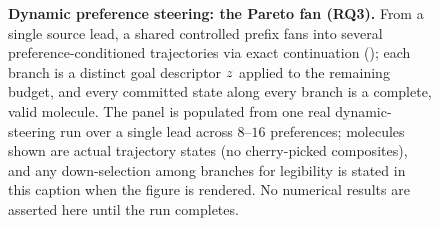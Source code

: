 \begin{figure}[t]
\centering
{}
\caption{\textbf{Dynamic preference steering: the Pareto fan (RQ3).} From a single source lead, a shared
controlled prefix fans into several preference-conditioned trajectories via exact continuation
(); each branch is a distinct goal descriptor $z$ applied to the remaining budget,
and every committed state along every branch is a complete, valid molecule. The panel is populated from
one real dynamic-steering run over a single lead across $8$--$16$ preferences; molecules shown are actual
trajectory states (no cherry-picked composites), and any down-selection among branches for legibility is
stated in this caption when the figure is rendered. No numerical results are asserted here until the run
completes.}
\label{fig:fan}
\end{figure}
